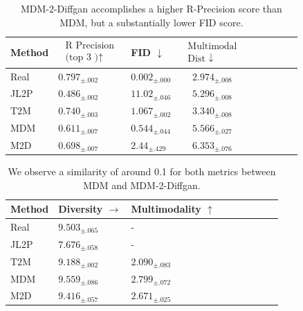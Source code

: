 \documentclass[10pt,twocolumn,letterpaper]{article}
\begin{document}
\begin{table}[h]
    \centering
    \begin{tabular}{|p{1.4cm}|p{1.8cm}|p{1.5cm}|c|c|c|c|c|c|}
    \hline Method & $\begin{array}{l}\text { R Precision } \\
    \text { (top } 3 \text { )↑ }\end{array}$ & FID $\downarrow$ & $\begin{array}{c}\text { Multimodal } \\
    \text { Dist } \downarrow\end{array}$ \\
    \hline Real & $0.797_{ \pm .002}$ & $0.002_{ \pm .000}$ & $2.974_{ \pm .008}$ \\
    \hline JL2P & $0.486_{ \pm .002}$ & $11.02_{ \pm .046}$ & $5.296_{ \pm .008}$ \\
    \hline $\mathrm{T} 2 \mathrm{M}$ & $0.740_{ \pm .003}$ & $1.067_{ \pm .002}$ & $3.340_{ \pm .008}$ \\
    \hline MDM & $0.611_{ \pm .007}$ & $0.544_{ \pm .044}$ & $5.566_{ \pm .027}$ \\
    \hline M2D & $0.698_{ \pm .007}$ & $2.44_{ \pm .429}$ & $6.353_{ \pm .076}$ \\
    \hline
    \end{tabular}
    \caption{MDM-2-Diffgan accomplishes a higher R-Precision score than MDM, but a substantially lower FID score.}
    \label{tab:metrics}
\end{table}
\begin{table}[h]
    \begin{tabular}{|p{2cm}|p{2cm}|p{2cm}|c|c|c|c|c|c|}
        \hline Method & Diversity $\rightarrow$ & Multimodality $\uparrow$ \\
        \hline Real & $9.503_{ \pm .065}$ & - \\
        \hline JL2P & $7.676_{ \pm .058}$ & - \\
        \hline $\mathrm{T} 2 \mathrm{M}$ & $9.188_{ \pm .002}$ & $2.090_{ \pm .083}$ \\
        \hline MDM & $9.559_{ \pm .086}$ & $2.799_{ \pm .072}$ \\
        \hline M2D & $9.416_{ \pm .057}$ & $2.671_{ \pm .025}$ \\
        \hline
        \end{tabular}
    \caption{We observe a similarity of around 0.1 for both metrics between MDM and MDM-2-Diffgan.}
    \label{tab:metrics2}
\end{table}
\end{document}
